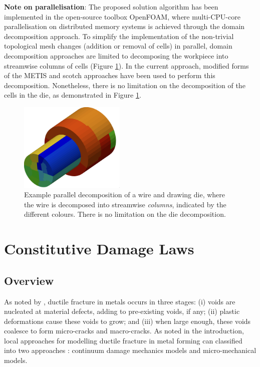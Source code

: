 \documentclass[sn-mathphys,Numbered]{sn-jnl}%
\begin{document}
\textbf{Note on parallelisation}: The proposed solution algorithm has been implemented in the open-source toolbox OpenFOAM, where multi-CPU-core parallelisation on distributed memory systems is achieved through the domain decomposition approach.
To simplify the implementation of the non-trivial topological mesh changes (addition or removal of cells) in parallel, domain decomposition approaches are limited to decomposing the workpiece into streamwise columns of cells (Figure \ref{fig:layerAdditionParallel}).
In the current approach, modified forms of the METIS \cite{metis} and scotch \cite{scotch} approaches have been used to perform this decomposition.
Nonetheless, there is no limitation on the decomposition of the cells in the die, as demonstrated in Figure \ref{fig:layerAdditionParallel}.
\begin{figure}[tbh]
	\centering
	\includegraphics[width=0.45\textwidth]{./Figures/layerAddition/parallel}
	\caption{Example parallel decomposition of a wire and drawing die, where the wire is decomposed into streamwise \emph{columns}, indicated by the different colours. There is no limitation on the die decomposition.}
	\label{fig:layerAdditionParallel}
\end{figure}




\section{Constitutive Damage Laws} \label{sec:constitutive_laws}


\subsection{Overview}

As noted by \citet{garrison_ductile_1987}, ductile fracture in metals occurs in three stages: (i) voids are nucleated at material defects, adding to pre-existing voids, if any; (ii) plastic deformations cause these voids to grow; and (iii) when large enough, these voids coalesce to form micro-cracks and macro-cracks.
As noted in the introduction, local approaches for modelling ductile fracture in metal forming can classified into two approaches \citep{cao_models_2017, tekkaya_damage_2020}: continuum damage mechanics models and micro-mechanical models.
\end{document}
